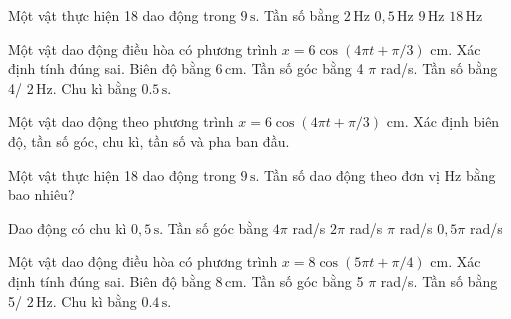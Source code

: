 \begin{ex}
Một vật thực hiện 18 dao động trong $9\,\text{s}$. Tần số bằng
\choice
{\True $2\,\text{Hz}$}
{$0,5\,\text{Hz}$}
{$9\,\text{Hz}$}
{$18\,\text{Hz}$}
\end{ex}

\begin{ex}
Một vật dao động điều hòa có phương trình $x=6\cos(4\pi t+\pi/3)$ cm. Xác định tính đúng sai.
\choiceTF
{\True Biên độ bằng $6\,\text{cm}$.}
{\True Tần số góc bằng 4 $\pi$ rad/s.}
{\True Tần số bằng 4/ $2\,\text{Hz}$.}
{\True Chu kì bằng $0.5\,\text{s}$.}
\end{ex}

\begin{ex}
Một vật dao động theo phương trình $x=6\cos(4\pi t+\pi/3)$ cm. Xác định biên độ, tần số góc, chu kì, tần số và pha ban đầu.
\choiceTF

\end{ex}

\begin{ex}
Một vật thực hiện 18 dao động trong $9\,\text{s}$. Tần số dao động theo đơn vị Hz bằng bao nhiêu?
\end{ex}

\begin{ex}
Dao động có chu kì $0,5\,\text{s}$. Tần số góc bằng
\choice
{\True $4\pi$ rad/s}
{$2\pi$ rad/s}
{$\pi$ rad/s}
{$0,5\pi$ rad/s}
\end{ex}

\begin{ex}
Một vật dao động điều hòa có phương trình $x=8\cos(5\pi t+\pi/4)$ cm. Xác định tính đúng sai.
\choiceTF
{\True Biên độ bằng $8\,\text{cm}$.}
{\True Tần số góc bằng 5 $\pi$ rad/s.}
{\True Tần số bằng 5/ $2\,\text{Hz}$.}
{\True Chu kì bằng $0.4\,\text{s}$.}
\end{ex}

